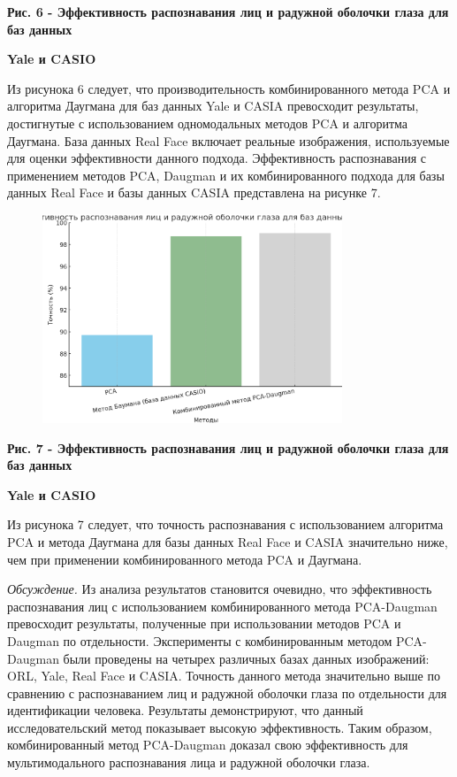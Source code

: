 \textbf{Рис. 6 - Эффективность распознавания лиц и радужной оболочки
глаза для баз данных}

\textbf{Yale и CASIO}

Из рисунока 6 следует, что производительность комбинированного метода
PCA и алгоритма Даугмана для баз данных Yale и CASIA превосходит
результаты, достигнутые с использованием одномодальных методов PCA и
алгоритма Даугмана. База данных Real Face включает реальные изображения,
используемые для оценки эффективности данного подхода. Эффективность
распознавания с применением методов PCA, Daugman и их комбинированного
подхода для базы данных Real Face и базы данных CASIA представлена на
рисунке 7.

\begin{figure}[H]
	\centering
	\includegraphics[width=0.8\textwidth]{assets/89}
	\caption*{}
\end{figure}

\textbf{Рис. 7 - Эффективность распознавания лиц и радужной оболочки
глаза для баз данных}

\textbf{Yale и CASIO}

Из рисунока 7 следует, что точность распознавания с использованием
алгоритма PCA и метода Даугмана для базы данных Real Face и CASIA
значительно ниже, чем при применении комбинированного метода PCA и
Даугмана.

\emph{Обсуждение.} Из анализа результатов становится очевидно, что
эффективность распознавания лиц с использованием комбинированного метода
PCA-Daugman превосходит результаты, полученные при использовании методов
PCA и Daugman по отдельности. Эксперименты с комбинированным методом
PCA-Daugman были проведены на четырех различных базах данных
изображений: ORL, Yale, Real Face и CASIA. Точность данного метода
значительно выше по сравнению с распознаванием лиц и радужной оболочки
глаза по отдельности для идентификации человека. Результаты
демонстрируют, что данный исследовательский метод показывает высокую
эффективность. Таким образом, комбинированный метод PCA-Daugman доказал
свою эффективность для мультимодального распознавания лица и радужной
оболочки глаза.

